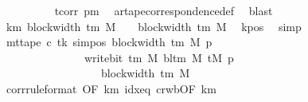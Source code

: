 \begin{isabellebody}
\ \ \ \ \ \ \ \ \isamarkupfalse%
\ tcorr\ pm{}\ \isamarkupfalse%
\ ar{\isacharunderscore}{\kern0pt}tape{\isacharunderscore}{\kern0pt}correspondence{\isacharunderscore}{\kern0pt}def\ \isamarkupfalse%
\ blast\isanewline
\ \ \ \ \ \ \isamarkupfalse%
\ km{}{\isacharcolon}{\kern0pt}\ {\isachardoublequoteopen}block{\isacharunderscore}{\kern0pt}width\ {\isacharparenleft}{\kern0pt}{\isasymGamma}{\isacharunderscore}{\kern0pt}tm\ M{\isacharparenright}{\kern0pt}\ {\isacharminus}{\kern0pt}\ {}\ {\isacharless}{\kern0pt}\ block{\isacharunderscore}{\kern0pt}width\ {\isacharparenleft}{\kern0pt}{\isasymGamma}{\isacharunderscore}{\kern0pt}tm\ M{\isacharparenright}{\kern0pt}{\isachardoublequoteclose}\ \isamarkupfalse%
\ kpos\ \isamarkupfalse%
\ simp\isanewline
\ \ \ \ \ \ \isamarkupfalse%
\ {\isachardoublequoteopen}mt{\isacharunderscore}{\kern0pt}tape\ c{\isacharprime}{\kern0pt}\ tk\ {\isacharparenleft}{\kern0pt}sim{\isacharunderscore}{\kern0pt}pos\ {\isacharparenleft}{\kern0pt}block{\isacharunderscore}{\kern0pt}width\ {\isacharparenleft}{\kern0pt}{\isasymGamma}{\isacharunderscore}{\kern0pt}tm\ M{\isacharparenright}{\kern0pt}{\isacharparenright}{\kern0pt}\ p\ {\isacharminus}{\kern0pt}\ {}{\isacharparenright}{\kern0pt}\isanewline
\ \ \ \ \ \ \ \ \ \ \ \ \ \ {\isacharequal}{\kern0pt}\ write{\isacharunderscore}{\kern0pt}bit\ {\isacharparenleft}{\kern0pt}{\isasymGamma}{\isacharunderscore}{\kern0pt}tm\ M{\isacharparenright}{\kern0pt}\ {\isacharparenleft}{\kern0pt}bl{\isacharunderscore}{\kern0pt}tm\ M{\isacharparenright}{\kern0pt}\ {\isacharparenleft}{\kern0pt}tM\ {\isacharparenleft}{\kern0pt}p\ {\isacharminus}{\kern0pt}\ {}{\isacharparenright}{\kern0pt}{\isacharparenright}{\kern0pt}\isanewline
\ \ \ \ \ \ \ \ \ \ \ \ \ \ \ \ \ \ {\isacharparenleft}{\kern0pt}block{\isacharunderscore}{\kern0pt}width\ {\isacharparenleft}{\kern0pt}{\isasymGamma}{\isacharunderscore}{\kern0pt}tm\ M{\isacharparenright}{\kern0pt}\ {\isacharminus}{\kern0pt}\ {}{\isacharparenright}{\kern0pt}{\isachardoublequoteclose}\isanewline
\ \ \ \ \ \ \ \ \isamarkupfalse%
\ corr{}{\isacharbrackleft}{\kern0pt}rule{\isacharunderscore}{\kern0pt}format{\isacharcomma}{\kern0pt}\ OF\ km{}{\isacharbrackright}{\kern0pt}\ idx{\isacharunderscore}{\kern0pt}eq\ cr{\isacharunderscore}{\kern0pt}wb{\isacharbrackleft}{\kern0pt}OF\ km{}{\isacharbrackright}{\kern0pt}\ \isamarkupfalse%

\end{isabellebody}
